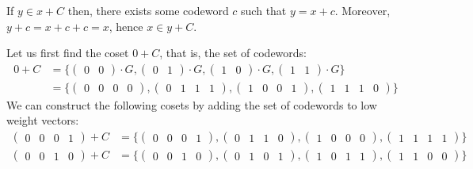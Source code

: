 \begin{solution}
If $y\in x+C$ then, there exists some codeword $c$ such that $y=x+c$. Moreover, $y+c=x+c+c=x$, hence $x\in y+C$.
\end{solution}
\begin{solution}
Let us first find the coset $0+C$, that is, the set of codewords:
\begin{align}
0+C&=\{\begin{pmatrix}0&0\end{pmatrix}\cdot G,\begin{pmatrix}0&1\end{pmatrix}\cdot G,\begin{pmatrix}1&0\end{pmatrix}\cdot G,\begin{pmatrix}1&1\end{pmatrix}\cdot G\}\\
&=\{\begin{pmatrix}0&0&0&0\end{pmatrix},\begin{pmatrix}0&1&1&1\end{pmatrix},\begin{pmatrix}1&0&0&1\end{pmatrix},\begin{pmatrix}1&1&1&0\end{pmatrix}\}
\end{align}
We can construct the following cosets by adding the set of codewords to low weight vectors:
\begin{align}
\begin{pmatrix}0&0&0&1\end{pmatrix}+C&=\{\begin{pmatrix}0&0&0&1\end{pmatrix},\begin{pmatrix}0&1&1&0\end{pmatrix},\begin{pmatrix}1&0&0&0\end{pmatrix},\begin{pmatrix}1&1&1&1\end{pmatrix}\}\\
\begin{pmatrix}0&0&1&0\end{pmatrix}+C&=\{\begin{pmatrix}0&0&1&0\end{pmatrix},\begin{pmatrix}0&1&0&1\end{pmatrix},\begin{pmatrix}1&0&1&1\end{pmatrix},\begin{pmatrix}1&1&0&0\end{pmatrix}\}\\

\end{align}
\end{solution}
